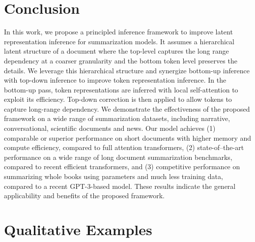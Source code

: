 \documentclass{article} \usepackage{iclr2022_conference,times}
\begin{document}
\section{Conclusion}
In this work, we propose a principled inference framework to improve latent representation inference for summarization models. It assumes a hierarchical latent structure of a document where the top-level captures the long range dependency at a coarser granularity and the bottom token level preserves the details. We leverage this hierarchical structure and synergize bottom-up inference with top-down inference to improve token representation inference. In the bottom-up pass, token representations are inferred with local self-attention to exploit its efficiency. Top-down correction is then applied to allow tokens to capture long-range dependency. We demonstrate the effectiveness of the proposed framework on a wide range of summarization datasets, including narrative, conversational, scientific documents and news. Our model achieves (1) comparable or superior performance on short documents with higher memory and compute efficiency, compared to full attention transformers, (2) state-of--the-art performance on a wide range of long document summarization benchmarks, compared to recent efficient transformers, and (3) competitive performance on summarizing whole books using  parameters and much less training data, compared to a recent GPT-3-based model. These results indicate the general applicability and benefits of the proposed framework. 





\clearpage
\appendix
\section{Qualitative Examples}
\end{document}
